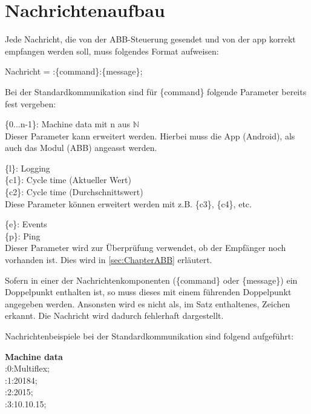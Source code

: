 \section{Nachrichtenaufbau}
Jede Nachricht, die von der ABB-Steuerung gesendet und von der \gls{app} 
korrekt 
empfangen werden soll, muss folgendes Format aufweisen:

Nachricht = :\{command\}:\{message\};

Bei der Standardkommunikation sind für \{command\} folgende Parameter bereits 
fest vergeben:

\{0...n-1\}: Machine data mit n aus $\mathbb{N}$ \\
Dieser Parameter kann erweitert werden. Hierbei muss die App (Android), als 
auch das Modul (ABB) angeasst werden.

\{l\}: Logging \\

\{c1\}: Cycle time (Aktueller Wert)\\
\{c2\}: Cycle time (Durchschnittswert)\\
Diese Parameter können erweitert werden mit z.B. \{c3\}, \{c4\}, etc.

\{e\}: Events\\

\{p\}: Ping\\
Dieser Parameter wird zur Überprüfung verwendet, ob der Empfänger noch 
vorhanden ist. Dies wird in \ref{sec:ChapterABB} erläutert.

Sofern in einer der Nachrichtenkomponenten (\{command\} oder \{message\}) ein 
Doppelpunkt enthalten ist, so muss dieses mit einem führenden Doppelpunkt 
angegeben werden. Ansonsten wird es nicht als, im Satz enthaltenes, Zeichen 
erkannt. Die Nachricht wird dadurch fehlerhaft dargestellt.

Nachrichtenbeispiele bei der Standardkommunikation sind folgend aufgeführt:

\textbf{Machine data}\\
:0:Multiflex; \\
:1:20184; \\
:2:2015; \\
:3:10.10.15; \\

